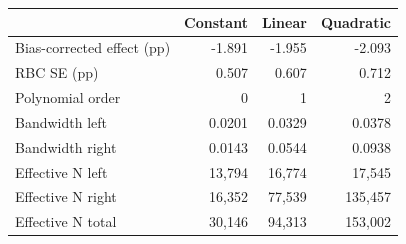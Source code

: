 \begin{center}\small
\renewcommand{\arraystretch}{1.15}
\begin{tabular}{@{}lrrr@{}}\toprule
 & Constant & Linear & Quadratic\\\midrule
Bias-corrected effect (pp) & -1.891 & -1.955 & -2.093\\
RBC SE (pp) & 0.507 & 0.607 & 0.712\\
Polynomial order & 0 & 1 & 2\\
Bandwidth left & 0.0201 & 0.0329 & 0.0378\\
Bandwidth right & 0.0143 & 0.0544 & 0.0938\\
Effective N left & 13,794 & 16,774 & 17,545\\
Effective N right & 16,352 & 77,539 & 135,457\\
Effective N total & 30,146 & 94,313 & 153,002\\
\bottomrule\end{tabular}\end{center}
